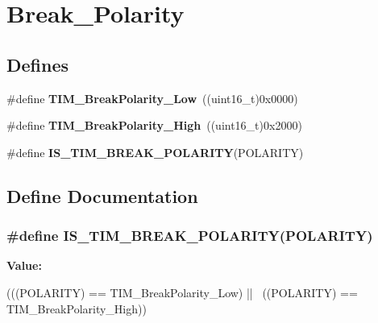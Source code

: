 \hypertarget{group__Break__Polarity}{
\section{Break\_\-Polarity}
\label{group__Break__Polarity}
}
\subsection*{Defines}
\begin{DoxyCompactItemize}
\item 
\hypertarget{group__Break__Polarity_ga565656ca81d17f9a1807afe3971dff6e}{
\#define {\bfseries TIM\_\-BreakPolarity\_\-Low}~((uint16\_\-t)0x0000)}
\label{group__Break__Polarity_ga565656ca81d17f9a1807afe3971dff6e}

\item 
\hypertarget{group__Break__Polarity_gabd4b72079548fd8903413a348539542b}{
\#define {\bfseries TIM\_\-BreakPolarity\_\-High}~((uint16\_\-t)0x2000)}
\label{group__Break__Polarity_gabd4b72079548fd8903413a348539542b}

\item 
\#define {\bfseries IS\_\-TIM\_\-BREAK\_\-POLARITY}(POLARITY)
\end{DoxyCompactItemize}


\subsection{Define Documentation}
\hypertarget{group__Break__Polarity_gaa29e33e74c5ff10972357ddd3f47f078}{
\subsubsection[{IS\_\-TIM\_\-BREAK\_\-POLARITY}]{\setlength{\rightskip}{0pt plus 5cm}\#define IS\_\-TIM\_\-BREAK\_\-POLARITY(POLARITY)}}
\label{group__Break__Polarity_gaa29e33e74c5ff10972357ddd3f47f078}
{\bfseries Value:}
\begin{DoxyCode}
(((POLARITY) == TIM_BreakPolarity_Low) || \
                                         ((POLARITY) == TIM_BreakPolarity_High))
\end{DoxyCode}
